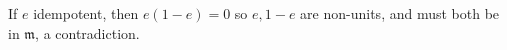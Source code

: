 If $e$ idempotent, then $e(1-e)=0$ so $e,1-e$ are non-units, and must both be in $\mathfrak m$, a contradiction.
